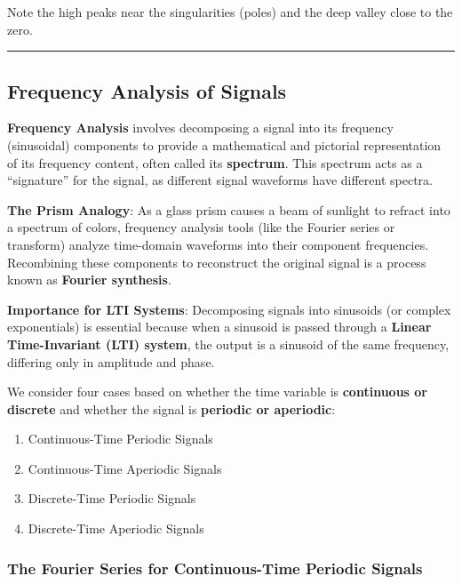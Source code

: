 Note the high peaks near the singularities (poles) and the deep valley
close to the zero.

\begin{center}\rule{0.5\linewidth}{0.5pt}\end{center}

\hypertarget{frequency-analysis-of-signals}{%
\subsection{Frequency Analysis of
Signals}\label{frequency-analysis-of-signals}}

\textbf{Frequency Analysis} involves decomposing a signal into its
frequency (sinusoidal) components to provide a mathematical and
pictorial representation of its frequency content, often called its
\textbf{spectrum}. This spectrum acts as a ``signature'' for the signal,
as different signal waveforms have different spectra.

\textbf{The Prism Analogy}: As a glass prism causes a beam of sunlight
to refract into a spectrum of colors, frequency analysis tools (like the
Fourier series or transform) analyze time-domain waveforms into their
component frequencies. Recombining these components to reconstruct the
original signal is a process known as \textbf{Fourier synthesis}.

\textbf{Importance for LTI Systems}: Decomposing signals into sinusoids
(or complex exponentials) is essential because when a sinusoid is passed
through a \textbf{Linear Time-Invariant (LTI) system}, the output is a
sinusoid of the same frequency, differing only in amplitude and phase.

We consider four cases based on whether the time variable is
\textbf{continuous or discrete} and whether the signal is
\textbf{periodic or aperiodic}:

\begin{enumerate}
\def\labelenumi{\arabic{enumi}.}
\tightlist
\item
  Continuous-Time Periodic Signals
\item
  Continuous-Time Aperiodic Signals
\item
  Discrete-Time Periodic Signals
\item
  Discrete-Time Aperiodic Signals
\end{enumerate}

\hypertarget{the-fourier-series-for-continuous-time-periodic-signals}{%
\subsubsection{The Fourier Series for Continuous-Time Periodic
Signals}\label{the-fourier-series-for-continuous-time-periodic-signals}}

